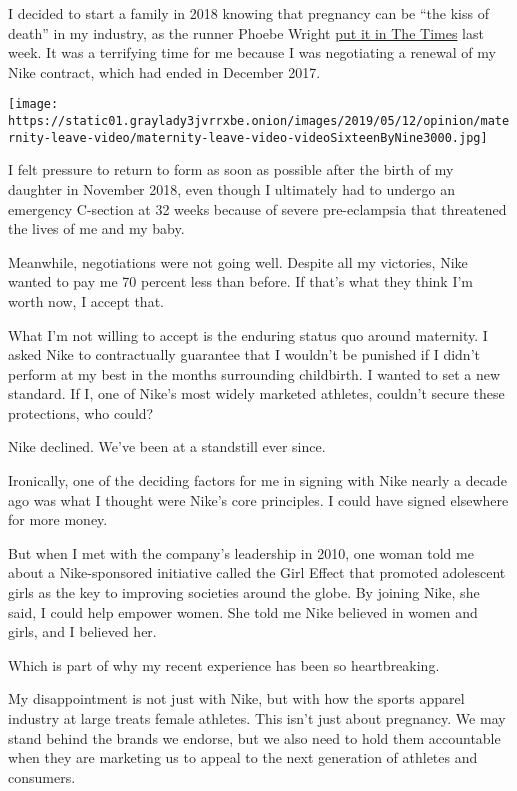 I decided to start a family in 2018 knowing that pregnancy can be ``the
kiss of death'' in my industry, as the runner Phoebe Wright
\href{https://www.nytimes3xbfgragh.onion/2019/05/12/opinion/nike-maternity-leave.html}{put
it in The Times} last week. It was a terrifying time for me because I
was negotiating a renewal of my Nike contract, which had ended in
December 2017.

\texttt{[image: https://static01.graylady3jvrrxbe.onion/images/2019/05/12/opinion/maternity-leave-video/maternity-leave-video-videoSixteenByNine3000.jpg]}

I felt pressure to return to form as soon as possible after the birth of
my daughter in November 2018, even though I ultimately had to undergo an
emergency C-section at 32 weeks because of severe pre-eclampsia that
threatened the lives of me and my baby.

Meanwhile, negotiations were not going well. Despite all my victories,
Nike wanted to pay me 70 percent less than before. If that's what they
think I'm worth now, I accept that.

What I'm not willing to accept is the enduring status quo around
maternity. I asked Nike to contractually guarantee that I wouldn't be
punished if I didn't perform at my best in the months surrounding
childbirth. I wanted to set a new standard. If I, one of Nike's most
widely marketed athletes, couldn't secure these protections, who could?

Nike declined. We've been at a standstill ever since.

Ironically, one of the deciding factors for me in signing with Nike
nearly a decade ago was what I thought were Nike's core principles. I
could have signed elsewhere for more money.

But when I met with the company's leadership in 2010, one woman told me
about a Nike-sponsored initiative called the Girl Effect that promoted
adolescent girls as the key to improving societies around the globe. By
joining Nike, she said, I could help empower women. She told me Nike
believed in women and girls, and I believed her.

Which is part of why my recent experience has been so heartbreaking.

My disappointment is not just with Nike, but with how the sports apparel
industry at large treats female athletes. This isn't just about
pregnancy. We may stand behind the brands we endorse, but we also need
to hold them accountable when they are marketing us to appeal to the
next generation of athletes and consumers.

